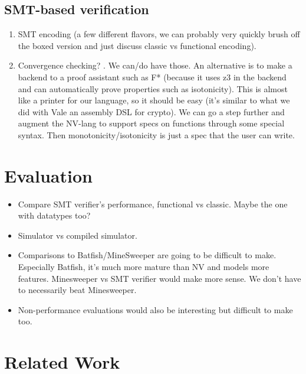 \documentclass[sigconf,10pt]{acmart}
\begin{document}
\subsection{SMT-based verification}
\begin{enumerate}
  \item SMT encoding (a few different flavors, we can probably very quickly brush off the boxed version and just discuss classic vs functional encoding).
  \item Convergence checking? . We can/do have those. An alternative is to make a backend to a proof assistant such as F* (because it uses z3 in the backend and can automatically prove properties such as isotonicity). This is almost like a printer for our language, so it should be easy (it's similar to what we did with Vale an assembly DSL for crypto). We can go a step further and augment the NV-lang to support specs on functions through some special syntax. Then monotonicity/isotonicity is just a spec that the user can write.
\end{enumerate}

%
%
%
%

\section{Evaluation}
\label{sec:evaluation}

\begin{itemize}
  \item Compare SMT verifier's performance, functional vs classic. Maybe the one with datatypes too?
  \item Simulator vs compiled simulator.
  \item Comparisons to Batfish/MineSweeper are going to be difficult to make. Especially Batfish, it's much more mature than NV and models more features. Minesweeper vs SMT verifier would make more sense. We don't have to necessarily beat Minesweeper.
  \item Non-performance evaluations would also be interesting but difficult to make too.
\end{itemize}

%
%
%
%

\section{Related Work}
\label{sec:related}
\end{document}
